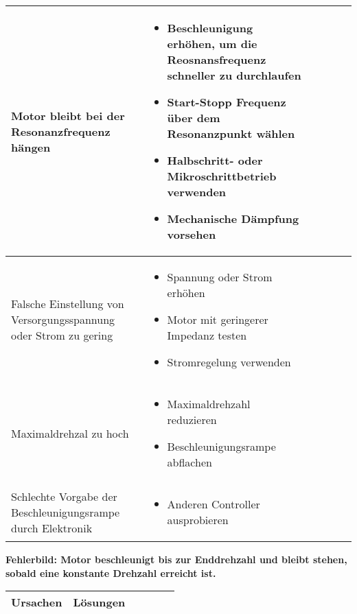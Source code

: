 {{{\begin{center}
\begin{tabularx}{\textwidth}{|X|X|X|X|X|X|}
  		Motor bleibt bei der Resonanzfrequenz hängen & 
  		\begin{itemize} 
  		\item {Beschleunigung erhöhen, um die Reosnansfrequenz schneller zu durchlaufen} \item {Start-Stopp Frequenz über dem Resonanzpunkt wählen} \item {Halbschritt- oder Mikroschrittbetrieb verwenden} \item {Mechanische Dämpfung vorsehen} 
  		\end{itemize}	 \\	\hline
  		Falsche Einstellung von Versorgungsspannung oder Strom zu gering & 
  		\begin{itemize}
  		\item {Spannung oder Strom erhöhen} \item {Motor mit geringerer Impedanz testen} \item {Stromregelung verwenden}
  		\end{itemize}\\	\hline
		Maximaldrehzal zu hoch & 
		\begin{itemize}
		\item {Maximaldrehzahl reduzieren} \item {Beschleunigungsrampe abflachen}
		\end{itemize}\\ \hline
		Schlechte Vorgabe der Beschleunigungsrampe durch Elektronik & 
		\begin{itemize}
		\item {Anderen Controller ausprobieren }
		\end{itemize}\\ \hline
\end{tabularx}
\end{center}

{\textbf{Fehlerbild: Motor beschleunigt bis zur Enddrehzahl und bleibt stehen, sobald eine konstante Drehzahl erreicht ist.}
\begin{center}
	\fontsize{8}{10}\selectfont
	\begin{tabularx}{\textwidth}{|X|X|X|X|X|X|}
		\hline 
		\textbf{Ursachen} & \textbf{Lösungen} \\ \hline
		

\end{tabularx}
\end{center}}}}}
